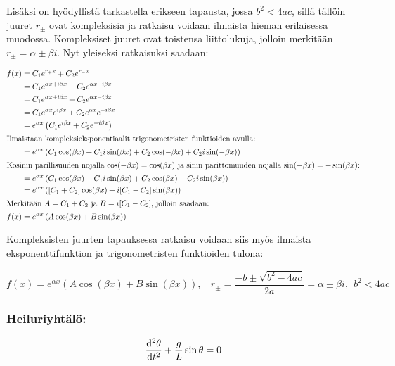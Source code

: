 \documentclass[../johdoksia.tex]{subfiles}
\begin{document}
	Lisäksi on hyödyllistä tarkastella erikseen tapausta, jossa $b^2 < 4ac$, sillä tällöin juuret $r_{\pm}$ ovat kompleksisia ja ratkaisu voidaan ilmaista hieman erilaisessa muodossa. Kompleksiset juuret ovat toistensa liittolukuja, jolloin merkitään $r_{\pm} = \alpha\pm\beta i$. Nyt yleiseksi ratkaisuksi saadaan:
	
	\begin{align*}
		f(x) &= C_1e^{r_+x} + C_2e^{r_-x} \\
		&= C_1e^{\alpha x + i\beta x} + C_2e^{\alpha x - i\beta x} \\
		&= C_1e^{\alpha x + i\beta x} + C_2e^{\alpha x - i\beta x} \\
		&= C_1e^{\alpha x}e^{i\beta x} + C_2e^{\alpha x}e^{- i\beta x} \\
		&= e^{\alpha x}\left(C_1e^{i\beta x} + C_2e^{- i\beta x}\right) \\
		\intertext{Ilmaistaan kompleksieksponentiaalit trigonometristen funktioiden avulla:}
		&= e^{\alpha x}\left(C_1\cos(\beta x) + C_1i\sin(\beta x) + C_2\cos(-\beta x) + C_2i\sin(-\beta x)\right) \\
		\intertext{Kosinin parillisuuden nojalla $\cos(-\beta x) = \cos(\beta x)$ ja sinin parittomuuden nojalla $\sin(-\beta x) = -\sin(\beta x)$:}
		&= e^{\alpha x}\left(C_1\cos(\beta x) + C_1i\sin(\beta x) + C_2\cos(\beta x) - C_2i\sin(\beta x)\right) \\
		&= e^{\alpha x}\left([C_1 + C_2]\cos(\beta x) + i[C_1 - C_2]\sin(\beta x)\right) \\
		\intertext{Merkitään $A = C_1 + C_2$ ja $B = i[C_1 - C_2]$, jolloin saadaan:}
		f(x) &= e^{\alpha x}\left(A\cos(\beta x) + B\sin(\beta x)\right)
	\end{align*}
	
	Kompleksisten juurten tapauksessa ratkaisu voidaan siis myös ilmaista eksponenttifunktion ja trigonometristen funktioiden tulona:
	
	\begin{equation}
		\boxed{f(x) = e^{\alpha x}\left(A\cos(\beta x) + B\sin(\beta x)\right), \ \ \ \ r_{\pm} = \frac{-b \pm \sqrt{b^2 - 4ac}}{2a} = \alpha \pm \beta i, \ \ b^2 < 4ac}
	\end{equation}
	\subsubsection{Heiluriyhtälö:}
	
	\begin{equation}
		\odv{^2\theta}{t^2} + \frac{g}{L}\sin\theta = 0
	\end{equation}
	
\end{document}
